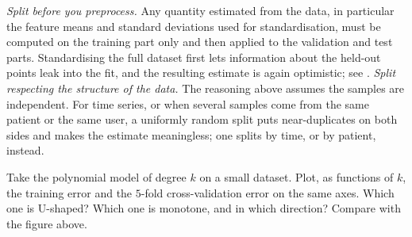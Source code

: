 \begin{remark}
\emph{Split before you preprocess.} Any quantity estimated from the data, in
particular the feature means and standard deviations used for standardisation, must be
computed on the training part only and then applied to the validation and test parts.
Standardising the full dataset first lets information about the held-out points leak
into the fit, and the resulting estimate is again optimistic; see
. \emph{Split
respecting the structure of the data.} The reasoning above assumes the samples are
independent. For time series, or when several samples come from the same patient or
the same user, a uniformly random split puts near-duplicates on both sides and makes
the estimate meaningless; one splits by time, or by patient, instead.
\end{remark}

\begin{exercise}[$\star$]
Take the polynomial model of degree $k$ on a small dataset. Plot, as functions of $k$,
the training error and the $5$-fold cross-validation error on the same axes. Which one
is U-shaped? Which one is monotone, and in which direction? Compare with the figure
above.
\end{exercise}
